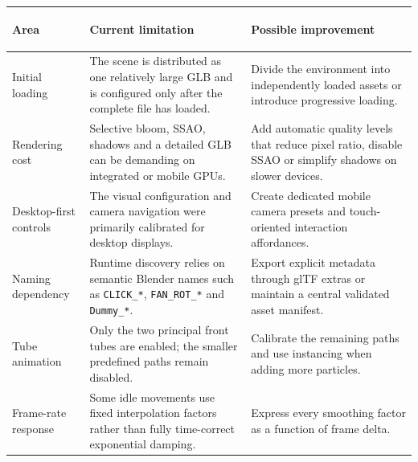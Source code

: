 \documentclass{report}
\begin{document}
\begin{table}[ht]
    \centering
    \footnotesize
    \setlength{\tabcolsep}{5pt}
    \renewcommand{\arraystretch}{1.2}

    \begin{tabularx}{\textwidth}{
        @{}
        >{\bfseries\raggedright\arraybackslash}p{}
        >{\raggedright\arraybackslash}p{}
        >{\raggedright\arraybackslash}X
        @{}
    }
        \toprule
        Area & Current limitation & Possible improvement \\
        \midrule

        Initial loading
        &
        The scene is distributed as one relatively large GLB and is
        configured only after the complete file has loaded.
        &
        Divide the environment into independently loaded assets or
        introduce progressive loading.
        \\

        Rendering cost
        &
        Selective bloom, SSAO, shadows and a detailed GLB can be
        demanding on integrated or mobile GPUs.
        &
        Add automatic quality levels that reduce pixel ratio, disable
        SSAO or simplify shadows on slower devices.
        \\

        Desktop-first controls
        &
        The visual configuration and camera navigation were primarily
        calibrated for desktop displays.
        &
        Create dedicated mobile camera presets and touch-oriented
        interaction affordances.
        \\

        Naming dependency
        &
        Runtime discovery relies on semantic Blender names such as
        \texttt{CLICK\_*}, \texttt{FAN\_ROT\_*} and
        \texttt{Dummy\_*}.
        &
        Export explicit metadata through glTF extras or maintain a
        central validated asset manifest.
        \\

        Tube animation
        &
        Only the two principal front tubes are enabled; the smaller
        predefined paths remain disabled.
        &
        Calibrate the remaining paths and use instancing when adding
        more particles.
        \\

        Frame-rate response
        &
        Some idle movements use fixed interpolation factors rather than
        fully time-correct exponential damping.
        &
        Express every smoothing factor as a function of frame delta.
        \\


\end{tabularx}
\end{table}
\end{document}
